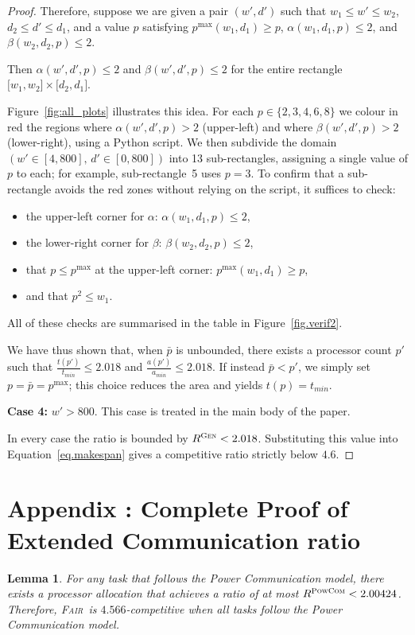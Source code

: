 \documentclass{article}
\newtheorem{lemma}{Lemma}
\newcommand\fair{\textsc{Fair}\xspace}
\newcommand\GEN{\textsc{Gen}\xspace}
\newcommand\PCOM{\textsc{PowCom}\xspace}
\begin{document}
\begin{proof}
Therefore, suppose we are given a pair $(w',d')$ such that  
$w_{1}\le w'\le w_{2}$, $d_{2}\le d'\le d_{1}$, and a value $p$ satisfying  
$p^{\max}(w_{1},d_{1})\ge p$, 
$\alpha(w_{1},d_{1},p)\le2$, and $\beta(w_{2},d_{2},p)\le2$. 

Then $\alpha(w',d',p)\le2$ and $\beta(w',d',p)\le2$ for the entire rectangle
$\bigl[w_{1},w_{2}\bigr]\times\bigl[d_{2},d_{1}\bigr]$.

Figure~\ref{fig:all_plots} illustrates this idea.  
For each $p\in\{2,3,4,6,8\}$ we colour in red the regions where
$\alpha(w',d',p)>2$ (upper-left) and where $\beta(w',d',p)>2$
(lower-right), using a Python script.  
We then subdivide the domain $(w'\in[4,800],\,d'\in[0,800])$ into
13 sub-rectangles, assigning a single value of $p$ to each; for example,
sub-rectangle~5 uses $p=3$.  
To confirm that a sub-rectangle avoids the red zones without relying on the
script, it suffices to check:
\begin{itemize}
    \item the upper-left corner for $\alpha$: $\alpha(w_{1},d_{1},p)\le2$,
    \item the lower-right corner for $\beta$: $\beta(w_{2},d_{2},p)\le2$,
    \item that $p \le p^{\max}$ at the upper-left corner: $p^{\max}(w_{1},d_{1})\ge p$,
    \item and that $p^2 \le w_1$.
\end{itemize}


All of these checks are summarised in the table in
Figure~\ref{fig.verif2}.

\medskip
We have thus shown that, when $\bar{p}$ is unbounded, there exists a
processor count $p'$ such that
\(\tfrac{t(p')}{t_{min}}\le2.018\) and
\(\tfrac{a(p')}{a_{min}}\le2.018\).
If instead $\bar{p}<p'$, we simply set $p=\bar{p}=p^{\max}$; this choice
reduces the area and yields $t(p)=t_{min}$.

\textbf{Case 4:} $w'>800$.  
This case is treated in the main body of the paper.

\medskip
In every case the ratio is bounded by $R^{\GEN}<2.018$.
Substituting this value into Equation~\eqref{eq.makespan}
gives a competitive ratio strictly below $4.6$.
\end{proof}


\FloatBarrier 
\newpage
\section{Appendix : Complete Proof of Extended Communication ratio}
\label{ap.powcom}
\begin{lemma}\label{lem.pcom}
For any task that follows the Power Communication model, there exists a processor allocation that achieves a ratio of at most $R^{\PCOM}<2.00424$. Therefore, \fair\ is $4.566$-competitive when all tasks follow the Power Communication model.
\end{lemma}
\end{document}
